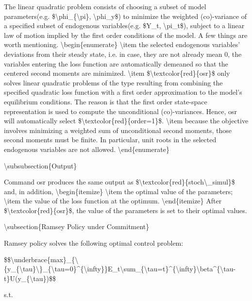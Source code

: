 \documentclass[10pt,math=newtx,citestyle=gb7714-2015,bibstyle=gb7714-2015]{elegantbook}
\begin{document}
	The linear quadratic problem consists of choosing a subset of model parameters(e.g. \$\textbackslash{}phi\_\{\textbackslash{}pi\}, \textbackslash{}phi\_y\$) to minimize the weighted (co)-variance of a specified subset of endogenous variables(e.g. \$Y\_t, \textbackslash{}pi\_t\$), subject to a linear law of motion implied by the first order conditions of the model. A few things are worth mentioning.
	\textbackslash{}begin\{enumerate\}
	\textbackslash{}item the selected endogenous variables’ deviations from their steady state, i.e. in case, they are not already mean 0, the variables entering the loss function are automatically demeaned so that the centered second moments are minimized.
	\textbackslash{}item \$\textbackslash{}textcolor\{red\}\{osr\}\$ only solves linear quadratic problems of the type resulting from combining the specified quadratic loss function with a first order approximation to the model’s equilibrium conditions. The reason is that the first order state-space representation is used to compute the unconditional (co)-variances. Hence, osr will automatically select \$\textbackslash{}textcolor\{red\}\{order=1\}\$.
	\textbackslash{}item because the objective involves minimizing a weighted sum of unconditional second moments, those second moments must be finite. In particular, unit roots in the selected endogenous variables are not allowed.
	\textbackslash{}end\{enumerate\}
	
	\textbackslash{}subsubsection\{Output\}
	
	Command osr produces the same output as \$\textbackslash{}textcolor\{red\}\{stoch\textbackslash{}\_simul\}\$ and, in addition,
	\textbackslash{}begin\{itemize\}
	\textbackslash{}item the optimal value of the parameters;
	\textbackslash{}item the value of the loss function at the optimum.
	\textbackslash{}end\{itemize\}
	After \$\textbackslash{}textcolor\{red\}\{osr\}\$, the value of the parameters is set to their optimal values.
	
	\textbackslash{}subsection\{Ramsey Policy under Commitment\}
	
	Ramsey policy solves the following optimal control problem:
	
	\$\$\textbackslash{}underbrace\{max\}\_\{\textbackslash{}\{y\_\{\textbackslash{}tau\}\textbackslash{}\}\_\{\textbackslash{}tau=0\}\^{}\{\textbackslash{}infty\}\}E\_t\textbackslash{}sum\_\{\textbackslash{}tau=t\}\^{}\{\textbackslash{}infty\}\textbackslash{}beta\^{}\{\textbackslash{}tau-t\}U(y\_\{\textbackslash{}tau\})\$\$
	
	s.t.
	
\end{document}
